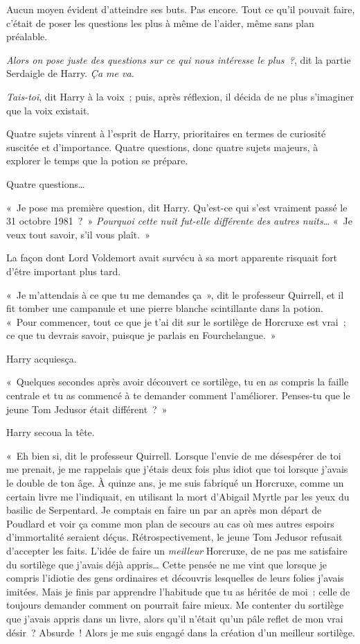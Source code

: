 Aucun moyen évident d'atteindre ses buts. Pas encore. Tout ce qu'il pouvait faire, c'était de poser les questions les plus à même de l'aider, même sans plan préalable.

\emph{Alors on pose juste des questions sur ce qui nous intéresse le plus~?}, dit la partie Serdaigle de Harry. \emph{Ça me va.}

\emph{Tais-toi}, dit Harry à la voix~; puis, après réflexion, il décida de ne plus s'imaginer que la voix existait.

Quatre sujets vinrent à l'esprit de Harry, prioritaires en termes de curiosité suscitée et d'importance. Quatre questions, donc quatre sujets majeurs, à explorer le temps que la potion se prépare.

Quatre questions…

«~Je pose ma première question, dit Harry. Qu'est-ce qui s'est vraiment passé le 31 octobre 1981~?~» \emph{Pourquoi cette nuit fut-elle différente des autres nuits}… «~Je veux tout savoir, s'il vous plaît.~»

La façon dont Lord Voldemort avait survécu à sa mort apparente risquait fort d'être important plus tard.

«~Je m'attendais à ce que tu me demandes ça~», dit le professeur Quirrell, et il fit tomber une campanule et une pierre blanche scintillante dans la potion. «~Pour commencer, tout ce que je t'ai dit sur le sortilège de Horcruxe est vrai~; ce que tu devrais savoir, puisque je parlais en Fourchelangue.~»

Harry acquiesça.

«~Quelques secondes après avoir découvert ce sortilège, tu en as compris la faille centrale et tu as commencé à te demander comment l'améliorer. Penses-tu que le jeune Tom Jedusor était différent~?~»

Harry secoua la tête.

«~Eh bien si, dit le professeur Quirrell. Lorsque l'envie de me désespérer de toi me prenait, je me rappelais que j'étais deux fois plus idiot que toi lorsque j'avais le double de ton âge. À quinze ans, je me suis fabriqué un Horcruxe, comme un certain livre me l'indiquait, en utilisant la mort d'Abigail Myrtle par les yeux du basilic de Serpentard. Je comptais en faire un par an après mon départ de Poudlard et voir ça comme mon plan de secours au cas où mes autres espoirs d'immortalité seraient déçus. Rétrospectivement, le jeune Tom Jedusor refusait d'accepter les faits. L'idée de faire un \emph{meilleur} Horcruxe, de ne pas me satisfaire du sortilège que j'avais déjà appris… Cette pensée ne me vint que lorsque je compris l'idiotie des gens ordinaires et découvris lesquelles de leurs folies j'avais imitées. Mais je finis par apprendre l'habitude que tu as héritée de moi~: celle de toujours demander comment on pourrait faire mieux. Me contenter du sortilège que j'avais appris dans un livre, alors qu'il n'était qu'un pâle reflet de mon vrai désir~? Absurde~! Alors je me suis engagé dans la création d'un meilleur sortilège.

